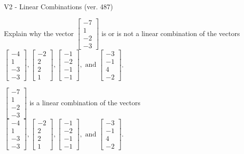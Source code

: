 \begin{exercise}
  \begin{exerciseTitle}V2 - Linear Combinations (ver. 487)\end{exerciseTitle}
  \begin{exerciseStatement}
    Explain why the vector \(\left[\begin{array}{c}
-7 \\
1 \\
-2 \\
-3
\end{array}\right]\)  is or is not a linear 
	combination of the vectors \(\left[\begin{array}{c}
-4 \\
1 \\
-3 \\
-3
\end{array}\right] , \left[\begin{array}{c}
-2 \\
2 \\
2 \\
1
\end{array}\right] , \left[\begin{array}{c}
-1 \\
-2 \\
-1 \\
-1
\end{array}\right] , \text{ and } \left[\begin{array}{c}
-3 \\
-1 \\
4 \\
-2
\end{array}\right]\).
	


  \end{exerciseStatement}
  \begin{exerciseAnswer}
   \(\left[\begin{array}{c}
-7 \\
1 \\
-2 \\
-3
\end{array}\right]\) 
  	 is  
	a linear combination of the vectors \(\left[\begin{array}{c}
-4 \\
1 \\
-3 \\
-3
\end{array}\right] , \left[\begin{array}{c}
-2 \\
2 \\
2 \\
1
\end{array}\right] , \left[\begin{array}{c}
-1 \\
-2 \\
-1 \\
-1
\end{array}\right] , \text{ and } \left[\begin{array}{c}
-3 \\
-1 \\
4 \\
-2
\end{array}\right]\).


\end{exerciseAnswer}
\end{exercise}
